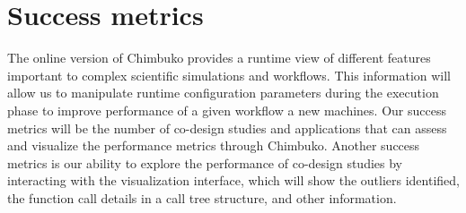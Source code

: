 \section{Success metrics}

The online version of Chimbuko provides a runtime view of different features important to complex scientific simulations and workflows. This information will allow us to manipulate runtime configuration parameters during the execution phase to improve performance of a given workflow a new machines. Our success metrics will be the number of co-design studies and applications that can assess and visualize the performance metrics through Chimbuko.  Another success metrics is our ability to explore the performance of co-design studies by interacting with the visualization interface, which will show the outliers identified, the function call details in a call tree structure, and other information. 
